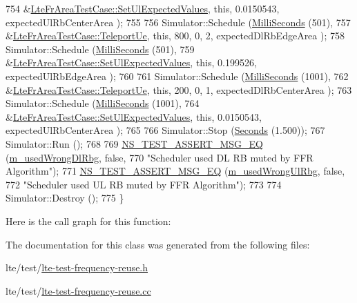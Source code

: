 \begin{DoxyCode}
754                        &\hyperlink{classLteFrAreaTestCase_aac2718dc3703d2ad389f88ffa20d035e}{LteFrAreaTestCase::SetUlExpectedValues}, \textcolor{keyword}{this},
       0.0150543, expectedUlRbCenterArea );
755 
756   Simulator::Schedule (\hyperlink{group__timecivil_gaf26127cf4571146b83a92ee18679c7a9}{MilliSeconds} (501),
757                        &\hyperlink{classLteFrAreaTestCase_ad644210c338d4e34da3c5d7f0c511269}{LteFrAreaTestCase::TeleportUe}, \textcolor{keyword}{this}, 800, 0, 2, 
      expectedDlRbEdgeArea );
758   Simulator::Schedule (\hyperlink{group__timecivil_gaf26127cf4571146b83a92ee18679c7a9}{MilliSeconds} (501),
759                        &\hyperlink{classLteFrAreaTestCase_aac2718dc3703d2ad389f88ffa20d035e}{LteFrAreaTestCase::SetUlExpectedValues}, \textcolor{keyword}{this},
       0.199526, expectedUlRbEdgeArea );
760 
761   Simulator::Schedule (\hyperlink{group__timecivil_gaf26127cf4571146b83a92ee18679c7a9}{MilliSeconds} (1001),
762                        &\hyperlink{classLteFrAreaTestCase_ad644210c338d4e34da3c5d7f0c511269}{LteFrAreaTestCase::TeleportUe}, \textcolor{keyword}{this}, 200, 0, 1, 
      expectedDlRbCenterArea );
763   Simulator::Schedule (\hyperlink{group__timecivil_gaf26127cf4571146b83a92ee18679c7a9}{MilliSeconds} (1001),
764                        &\hyperlink{classLteFrAreaTestCase_aac2718dc3703d2ad389f88ffa20d035e}{LteFrAreaTestCase::SetUlExpectedValues}, \textcolor{keyword}{this},
       0.0150543, expectedUlRbCenterArea );
765 
766   Simulator::Stop (\hyperlink{group__timecivil_ga33c34b816f8ff6628e33d5c8e9713b9e}{Seconds} (1.500));
767   Simulator::Run ();
768 
769   \hyperlink{group__testing_ga2a9d78cffb3db8e867c35fff0b698cf5}{NS\_TEST\_ASSERT\_MSG\_EQ} (\hyperlink{classLteFrAreaTestCase_acf1b825c0fc50c57ac990d11ea1529c0}{m\_usedWrongDlRbg}, \textcolor{keyword}{false},
770                          \textcolor{stringliteral}{"Scheduler used DL RB muted by FFR Algorithm"});
771   \hyperlink{group__testing_ga2a9d78cffb3db8e867c35fff0b698cf5}{NS\_TEST\_ASSERT\_MSG\_EQ} (\hyperlink{classLteFrAreaTestCase_a11e401119f17b78d6693ef29f82b8895}{m\_usedWrongUlRbg}, \textcolor{keyword}{false},
772                          \textcolor{stringliteral}{"Scheduler used UL RB muted by FFR Algorithm"});
773 
774   Simulator::Destroy ();
775 \}
\end{DoxyCode}


Here is the call graph for this function\+:




The documentation for this class was generated from the following files\+:\begin{DoxyCompactItemize}
\item 
lte/test/\hyperlink{lte-test-frequency-reuse_8h}{lte-\/test-\/frequency-\/reuse.\+h}\item 
lte/test/\hyperlink{lte-test-frequency-reuse_8cc}{lte-\/test-\/frequency-\/reuse.\+cc}\end{DoxyCompactItemize}
